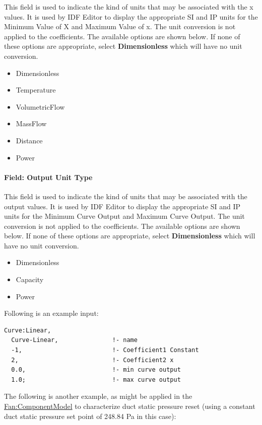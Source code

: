 This field is used to indicate the kind of units that may be associated with the x values. It is used by IDF Editor to display the appropriate SI and IP units for the Minimum Value of X and Maximum Value of x. The unit conversion is not applied to the coefficients. The available options are shown below. If none of these options are appropriate, select \textbf{Dimensionless} which will have no unit conversion.

\begin{itemize}
\item
  Dimensionless
\item
  Temperature
\item
  VolumetricFlow
\item
  MassFlow
\item
  Distance
\item
  Power
\end{itemize}

\paragraph{Field: Output Unit Type}\label{field-output-unit-type}

This field is used to indicate the kind of units that may be associated with the output values. It is used by IDF Editor to display the appropriate SI and IP units for the Minimum Curve Output and Maximum Curve Output. The unit conversion is not applied to the coefficients. The available options are shown below. If none of these options are appropriate, select \textbf{Dimensionless} which will have no unit conversion.

\begin{itemize}
\item
  Dimensionless
\item
  Capacity
\item
  Power
\end{itemize}

Following is an example input:

\begin{lstlisting}
Curve:Linear,
  Curve-Linear,               !- name
  -1,                         !- Coefficient1 Constant
  2,                          !- Coefficient2 x
  0.0,                        !- min curve output
  1.0;                        !- max curve output
\end{lstlisting}

The following is another example, as might be applied in the \hyperref[fancomponentmodel]{Fan:ComponentModel} to characterize duct static pressure reset (using a constant duct static pressure set point of 248.84 Pa in this case):

